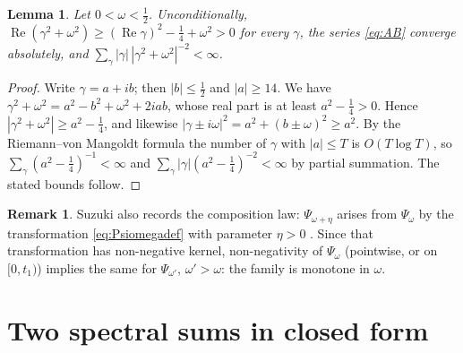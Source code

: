 \documentclass[11pt,reqno]{amsart}
\theoremstyle{plain}
\newtheorem{lemma}[theorem]{Lemma}
\theoremstyle{definition}
\newtheorem{remark}[theorem]{Remark}
\newcommand{\Rp}{\operatorname{Re}}
\begin{document}
\begin{lemma}\label{lem:conv}
Let $0<\omega<\tfrac12$. Unconditionally,
$\Rp(\gamma^{2}+\omega^{2})\ge(\Rp\gamma)^{2}-\tfrac14+\omega^{2}>0$ for every $\gamma$, the series
\eqref{eq:AB} converge absolutely, and
$\sum_\gamma|\gamma|\,|\gamma^{2}+\omega^{2}|^{-2}<\infty$.
\end{lemma}

\begin{proof}
Write $\gamma=a+ib$; then $|b|\le\tfrac12$ and $|a|\ge14$. We have
$\gamma^{2}+\omega^{2}=a^{2}-b^{2}+\omega^{2}+2iab$, whose real part is at least
$a^{2}-\tfrac14>0$. Hence $|\gamma^{2}+\omega^{2}|\ge a^{2}-\tfrac14$, and likewise
$|\gamma\pm i\omega|^{2}=a^{2}+(b\pm\omega)^{2}\ge a^{2}$. By the Riemann--von Mangoldt formula the
number of $\gamma$ with $|a|\le T$ is $O(T\log T)$, so $\sum_\gamma(a^{2}-\tfrac14)^{-1}<\infty$ and
$\sum_\gamma|\gamma|(a^{2}-\tfrac14)^{-2}<\infty$ by partial summation. The stated bounds follow.
\end{proof}

\begin{remark}
Suzuki also records the composition law: $\Psi_{\omega+\eta}$ arises from $\Psi_\omega$ by the
transformation \eqref{eq:Psiomegadef} with parameter $\eta>0$ \cite[\S11]{Suzuki2023}. Since that
transformation has non-negative kernel, non-negativity of $\Psi_\omega$ (pointwise, or on $[0,t_1)$)
implies the same for $\Psi_{\omega'}$, $\omega'>\omega$: the family is monotone in $\omega$.
\end{remark}

\section{Two spectral sums in closed form}\label{sec:AB}
\end{document}
